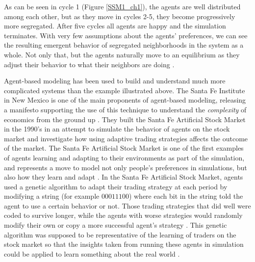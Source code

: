 \documentclass[12pt,twoside]{reedthesis}
\begin{document}
As can be seen in cycle 1 (Figure \ref{SSM1_ch1}), the agents are well distributed among each other, but as they move in cycles 2-5, they become progressively more segregated. After five cycles all agents are happy and the simulation terminates. With very few assumptions about the agents' preferences, we can see the resulting emergent behavior of segregated neighborhoods in the system as a whole. Not only that, but the agents naturally move to an equilibrium as they adjust their behavior to what their neighbors are doing \citep{Sargent2019}. 

Agent-based modeling has been used to build and understand much more complicated systems than the example illustrated above. The Santa Fe Institute in New Mexico is one of the main proponents of agent-based modeling, releasing a manifesto supporting the use of this technique to understand the {\em complexity} of economics from the ground up \citep{Backhouse2016}. They built the Santa Fe Artificial Stock Market in the 1990's in an attempt to simulate the behavior of agents on the stock market and investigate how using adaptive trading strategies affects the outcome of the market. The Santa Fe Artificial Stock Market is one of the first examples of agents learning and adapting to their environments as part of the simulation, and represents a move to model not only people's preferences in simulations, but also how they learn and adapt \citep{LeBaron2002}. In the Santa Fe Artificial Stock Market, agents used a genetic algorithm to adapt their trading strategy at each period by modifying a string (for example $00011100$) where each bit in the string told the agent to use a certain behavior or not. Those trading strategies that did well were coded to survive longer, while the agents with worse strategies would randomly modify their own or copy a more successful agent's strategy \citep{Joshi1998}. This genetic algorithm was supposed to be representative of the learning of traders on the stock market so that the insights taken from running these agents in simulation could be applied to learn something about the real world \citep{Arthur1992}. 
\end{document}

